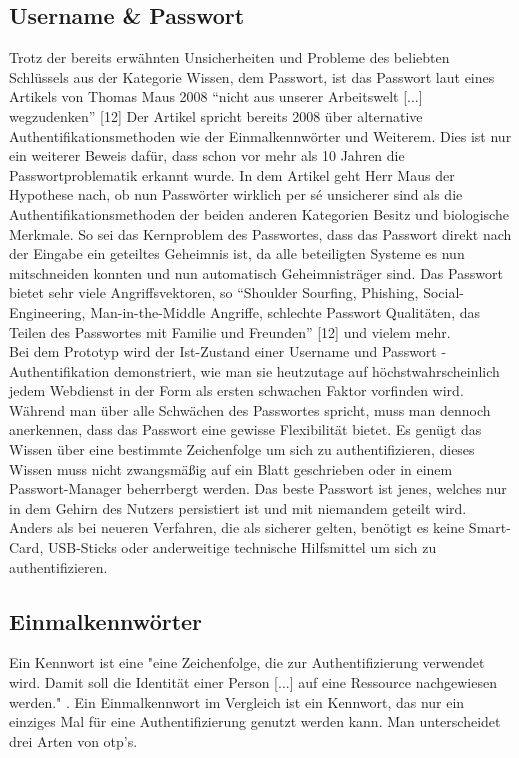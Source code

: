 \subsection{Username \& Passwort}
Trotz der bereits erwähnten Unsicherheiten und Probleme des beliebten Schlüssels aus der Kategorie Wissen, dem Passwort, ist das Passwort laut eines Artikels von Thomas Maus 2008 ``nicht aus unserer Arbeitswelt [...] wegzudenken'' [12] Der Artikel spricht bereits 2008 über alternative Authentifikationsmethoden wie der Einmalkennwörter und Weiterem. Dies ist nur ein weiterer Beweis dafür, dass schon vor mehr als 10 Jahren die Passwortproblematik erkannt wurde. In dem Artikel geht Herr Maus der Hypothese nach, ob nun Passwörter wirklich per sé unsicherer sind als die Authentifikationsmethoden der beiden anderen Kategorien Besitz und biologische Merkmale. So sei das Kernproblem des Passwortes, dass das Passwort direkt nach der Eingabe ein geteiltes Geheimnis ist, da alle beteiligten Systeme es nun mitschneiden konnten und nun automatisch Geheimnisträger sind. Das Passwort bietet sehr viele Angriffsvektoren, so ``Shoulder Sourfing, Phishing, Social-Engineering, Man-in-the-Middle Angriffe, schlechte Passwort Qualitäten, das Teilen des Passwortes mit Familie und Freunden'' [12] und vielem mehr. \\
Bei dem Prototyp wird der Ist-Zustand einer Username und Passwort - Authentifikation demonstriert, wie man sie heutzutage auf höchstwahrscheinlich jedem Webdienst in der Form als ersten schwachen Faktor vorfinden wird. Während man über alle Schwächen des Passwortes spricht, muss man dennoch anerkennen, dass das Passwort eine gewisse Flexibilität bietet. Es genügt das Wissen über eine bestimmte Zeichenfolge um sich zu authentifizieren, dieses Wissen muss nicht zwangsmäßig auf ein Blatt geschrieben oder in einem Passwort-Manager beherrbergt werden. Das beste Passwort ist jenes, welches nur in dem Gehirn des Nutzers persistiert ist und mit niemandem geteilt wird. Anders als bei neueren Verfahren, die als sicherer gelten, benötigt es keine Smart-Card, USB-Sticks oder anderweitige technische Hilfsmittel um sich zu authentifizieren.

\subsection{Einmalkennwörter}
Ein Kennwort ist eine "eine Zeichenfolge, die zur Authentifizierung verwendet wird. Damit soll die Identität einer Person [...] auf eine Ressource nachgewiesen werden." \cite{A4}. Ein Einmalkennwort im Vergleich ist ein Kennwort, das nur ein einziges Mal für eine Authentifizierung genutzt werden kann. Man unterscheidet drei Arten von \ac{otp}'s.


